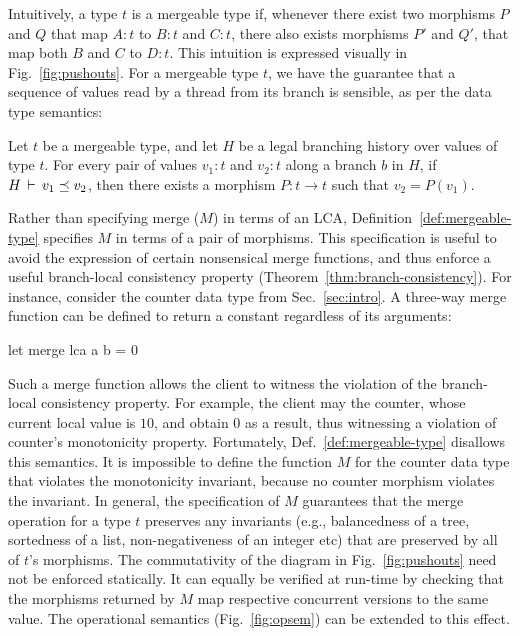Intuitively, a type $t$ is a mergeable type if, whenever there exist
two morphisms $P$ and $Q$ that map $A:t$ to $B:t$ and $C:t$, there
also exists morphisms $P'$ and $Q'$, that map both $B$ and $C$ to
$D:t$. This intuition is expressed visually in
Fig.~\ref{fig:pushouts}.  For a mergeable type $t$, we have the
guarantee that a sequence of values read by a thread from its branch
is sensible, as per the data type semantics:

\begin{theorem} 
\label{thm:branch-consistency}
Let $t$ be a mergeable type, and let $H$ be a legal branching history
over values of type $t$. For every pair of values $v_1:t$ and $v_2:t$
along a branch $b$ in $H$, if $H\,\vdash\,v_1 \preceq v_2$, then there
exists a morphism $P:t\rightarrow t$ such that $v_2 = P(v_1)$.
\end{theorem}

Rather than specifying merge ($M$) in terms of an LCA,
Definition~\ref{def:mergeable-type} specifies $M$ in terms of a pair
of morphisms.  This specification is useful to avoid the expression of certain
nonsensical merge functions, and thus enforce a useful branch-local
consistency property (Theorem~\ref{thm:branch-consistency}). For
instance, consider the counter data type from Sec.~\ref{sec:intro}. A
three-way merge function can be defined to return a constant
regardless of its arguments:
\begin{ocaml}
  let merge lca a b = 0
\end{ocaml}
Such a merge function allows the client to
witness the violation of the branch-local consistency property. For
example, the client may  the counter, whose current local
value is $10$, and obtain $0$ as a result, thus witnessing a violation
of counter's monotonicity property. Fortunately,
Def.~\ref{def:mergeable-type} disallows this semantics. It is
impossible to define the function $M$ for the counter data type that
violates the monotonicity invariant, because no counter morphism
violates the invariant. In general, the specification of $M$
guarantees that the merge operation for a type $t$ preserves any
invariants (e.g., balancedness of a tree, sortedness of a list,
non-negativeness of an integer etc) that are preserved by all of $t$'s
morphisms.  The commutativity of the diagram in
Fig.~\ref{fig:pushouts} need not be enforced statically. It can
equally be verified at run-time by checking that the morphisms returned by $M$
map respective concurrent versions to the same value. The
operational semantics (Fig.~\ref{fig:opsem}) can be extended to this
effect.

